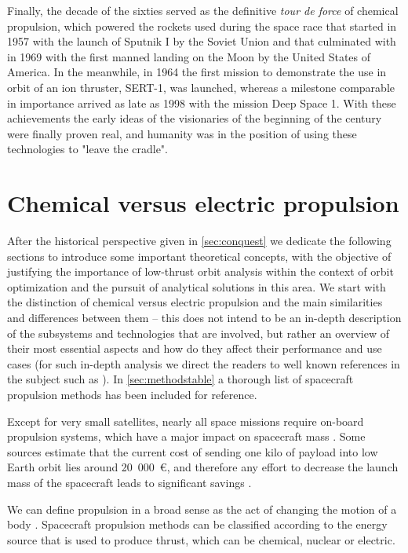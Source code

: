 Finally, the decade of the sixties served as the definitive \textit{tour de force} of chemical propulsion, which powered the rockets used during the space race that started in 1957 with the launch of Sputnik I by the Soviet Union and that culminated with in 1969 with the first manned landing on the Moon by the United States of America. In the meanwhile, in 1964 the first mission to demonstrate the use in orbit of an ion thruster, SERT-1, was launched, whereas a milestone comparable in importance arrived as late as 1998 with the mission Deep Space 1. With these achievements the early ideas of the visionaries of the beginning of the century were finally proven real, and humanity was in the position of using these technologies to "leave the cradle".

\section{Chemical versus electric propulsion} \label{sec:propulsion}

After the historical perspective given in \ref{sec:conquest} we dedicate the following sections to introduce some important theoretical concepts, with the objective of justifying the importance of low-thrust orbit analysis within the context of orbit optimization and the pursuit of analytical solutions in this area. We start with the distinction of chemical versus electric propulsion and the main similarities and differences between them -- this does not intend to be an in-depth description of the subsystems and technologies that are involved, but rather an overview of their most essential aspects and how do they affect their performance and use cases (for such in-depth analysis we direct the readers to well known references in the subject such as \cite{sutton2016rocket}). In \ref{sec:methodstable} a thorough list of spacecraft propulsion methods has been included for reference.

Except for very small satellites, nearly all space missions require on-board propulsion systems, which have a major impact on spacecraft mass \cite{curran1993nasa}. Some sources estimate that the current cost of sending one kilo of payload into low Earth orbit lies around 20~000~€, and therefore any effort to decrease the launch mass of the spacecraft leads to significant savings \cite{choueiri2009new}.

We can define propulsion in a broad sense as the act of changing the motion of a body \cite{sutton2016rocket}. Spacecraft propulsion methods can be classified according to the energy source that is used to produce thrust, which can be chemical, nuclear or electric.

